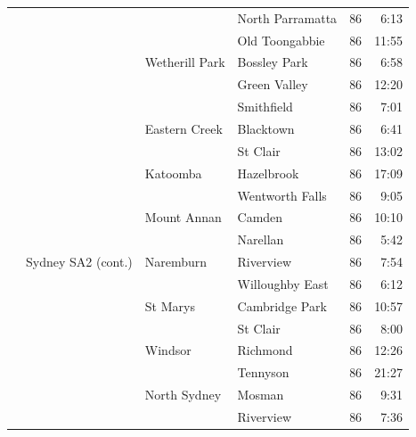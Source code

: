 \documentclass{grattan}
\begin{document}
\begin{longtable}{Nlllrr}
 &                                &                       & North Parramatta     & 86  & 6:13 \\
 &                                &                       & Old Toongabbie       & 86  & 11:55 \\
 &                                & Wetherill Park        & Bossley Park         & 86  & 6:58 \\
 &                                &                       & Green Valley         & 86  & 12:20 \\
 &                                &                       & Smithfield           & 86  & 7:01 \\
 &                                & Eastern Creek         & Blacktown            & 86  & 6:41 \\
 &                                &                       & St Clair             & 86  & 13:02 \\
 &                                & Katoomba              & Hazelbrook           & 86  & 17:09 \\
 &                                &                       & Wentworth Falls      & 86  & 9:05 \\
 &                                & Mount Annan           & Camden               & 86  & 10:10 \\
 &                                &                       & Narellan             & 86  & 5:42 \\
 & Sydney SA2 (cont.)             & Naremburn             & Riverview            & 86  & 7:54 \\
 &                                &                       & Willoughby East      & 86  & 6:12 \\
 &                                & St Marys              & Cambridge Park       & 86  & 10:57 \\
 &                                &                       & St Clair             & 86  & 8:00 \\
 &                                & Windsor               & Richmond             & 86  & 12:26 \\
 &                                &                       & Tennyson             & 86  & 21:27 \\
 &                                & North Sydney          & Mosman               & 86  & 9:31 \\
 &                                &                       & Riverview            & 86  & 7:36 \\

\end{longtable}
\end{document}

